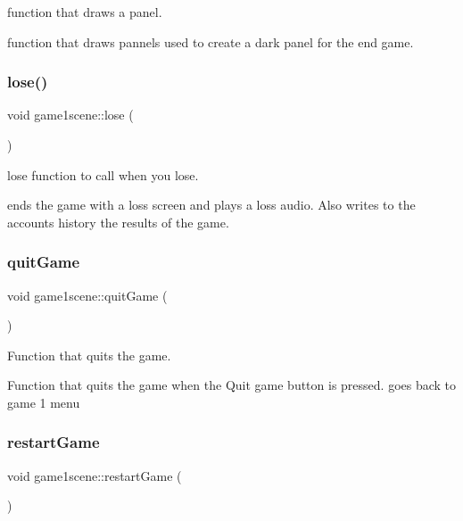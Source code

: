 function that draws a panel. 

function that draws pannels used to create a dark panel for the end game. \mbox{\label{classgame1scene_a7ea830c4a703722bc5450f29fbfddced}} 
\subsubsection{\texorpdfstring{lose()}{lose()}}
{\footnotesize\ttfamily void game1scene\+::lose (\begin{DoxyParamCaption}{ }\end{DoxyParamCaption})}



lose function to call when you lose. 

ends the game with a loss screen and plays a loss audio. Also writes to the account\textquotesingle{}s history the results of the game. \mbox{\label{classgame1scene_a72b63628ea5dc651654db088830afd87}} 
\subsubsection{\texorpdfstring{quit\+Game}{quitGame}}
{\footnotesize\ttfamily void game1scene\+::quit\+Game (\begin{DoxyParamCaption}{ }\end{DoxyParamCaption})\hspace{0.3cm}{\ttfamily [slot]}}



Function that quits the game. 

Function that quits the game when the Quit game button is pressed. goes back to game 1 menu \mbox{\label{classgame1scene_a62ae0fdc247d9cd0665844710b465c5c}} 
\subsubsection{\texorpdfstring{restart\+Game}{restartGame}}
{\footnotesize\ttfamily void game1scene\+::restart\+Game (\begin{DoxyParamCaption}{ }\end{DoxyParamCaption})\hspace{0.3cm}{\ttfamily [slot]}}



